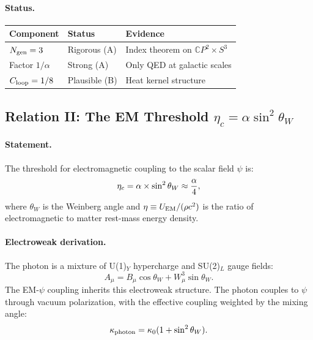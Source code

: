 \paragraph{Status.}
\begin{center}
\renewcommand{\arraystretch}{1.2}
\begin{tabular}{lll}
\toprule
Component & Status & Evidence \\
\midrule
$N_{\rm gen} = 3$ & Rigorous (A) & Index theorem on $\mathbb{C}P^2 \times S^3$ \\
Factor $1/\alpha$ & Strong (A) & Only QED at galactic scales \\
$C_{\rm loop} = 1/8$ & Plausible (B) & Heat kernel structure \\
\bottomrule
\end{tabular}
\end{center}

\subsection{Relation II: The EM Threshold $\eta_c = \alpha \sin^2\theta_W$}\label{sec:alpha-eta}

\paragraph{Statement.}
The threshold for electromagnetic coupling to the scalar field $\psi$ is:
\begin{equation}\label{eq:eta-relation}
\eta_c = \alpha \times \sin^2\theta_W \approx \frac{\alpha}{4},
\end{equation}
where $\theta_W$ is the Weinberg angle and $\eta \equiv U_{\rm EM}/(\rho c^2)$ is the ratio of electromagnetic to matter rest-mass energy density.

\paragraph{Electroweak derivation.}
The photon is a mixture of U(1)$_Y$ hypercharge and SU(2)$_L$ gauge fields:
\begin{equation}
A_\mu = B_\mu \cos\theta_W + W^3_\mu \sin\theta_W.
\end{equation}
The EM-$\psi$ coupling inherits this electroweak structure. The photon couples to $\psi$ through vacuum polarization, with the effective coupling weighted by the mixing angle:
\begin{equation}
\kappa_{\rm photon} = \kappa_0(1 + \sin^2\theta_W).
\end{equation}

